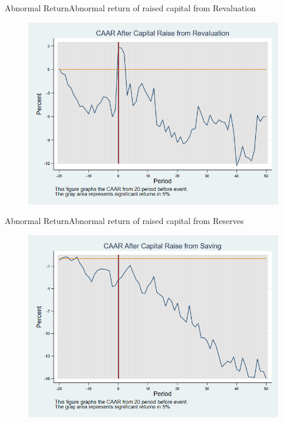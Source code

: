 \documentclass{beamer}
\begin{document}
	\begin{frame}{Abnormal Return}{Abnormal return of raised capital from Revaluation}
		\label{car_marketindustryRevaluation}
		\begin{figure}
			\centering
			\includegraphics[width=0.65\linewidth]{Output/car_marketindustryRevaluation}
			\label{fig:car_markeindustryindustrytRevaluation}
		\end{figure}
		
	\end{frame}
	
	
	\begin{frame}{Abnormal Return}{Abnormal return of raised capital from Reserves}
		\label{car_marketindustrySaving}
		\begin{figure}
			\centering
			\includegraphics[width=0.65\linewidth]{Output/car_marketindustrySaving}
			\label{fig:car_marketindustrySaving}
		\end{figure}
		
	\end{frame}
	
\end{document}

